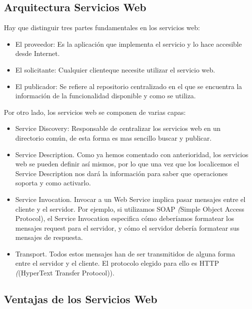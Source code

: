 \subsection{Arquitectura Servicios Web}
\label{cap:subsec:arquitecturaserviciosweb}
Hay que distinguir tres partes fundamentales en los servicios web:
\begin{itemize}
	\item El proveedor: Es la aplicación que implementa el servicio y lo hace accesible desde Internet.
	\item El solicitante: Cualquier clienteque necesite utilizar el servicio web.
	\item El publicador: Se refiere al repositorio centralizado en el que se encuentra la información de la funcionalidad disponible y como se utiliza.
	
\end{itemize}
Por otro lado, los servicios web se componen de varias capas:
\begin{itemize}
	\item Service Discovery: Responsable de centralizar los servicios web en un directorio común, de esta forma es mas sencillo buscar y publicar.
	\item Service Description. Como ya hemos comentado con anterioridad, los servicios web se pueden definir así mismos, por lo que una vez que los localicemos el Service Description nos dará la información para saber que operaciones soporta y como activarlo.
	\item Service Invocation. Invocar a un Web Service implica pasar mensajes entre el cliente y el servidor. Por ejemplo, si utilizamos SOAP  \textit({Simple Object Access Protocol}), el Service Invocation especifica cómo deberíamos formatear los mensajes request para el servidor, y cómo el servidor debería formatear sus mensajes de respuesta.
	\item Transport. Todos estos mensajes han de ser transmitidos de alguna forma entre el servidor y el cliente. El protocolo elegido para ello es HTTP  \textit({(HyperText Transfer Protocol)}). 
\end{itemize}



\subsection{Ventajas de los  Servicios Web}
\label{cap:subsec:ventajasserviciosweb}

